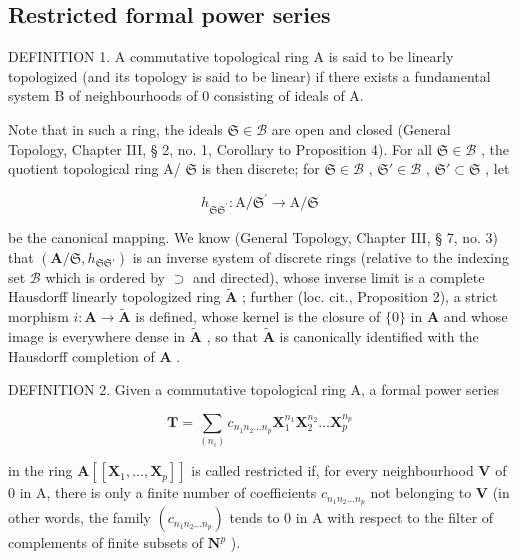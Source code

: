 \subsection{Restricted formal power series}

DEFINITION 1. A commutative topological ring A is said to be linearly topologized (and its topology is said to be linear) if there exists a fundamental system B of neighbourhoods of 0 consisting of ideals of A.

Note that in such a ring, the ideals \(\mathfrak{S} \in \mathcal{B}\) are open and closed (General Topology, Chapter III, § 2, no. 1, Corollary to Proposition 4). For all \(\mathfrak{S} \in \mathcal{B}\) , the quotient topological ring A/ \(\mathfrak{S}\) is then discrete; for \(\mathfrak{S} \in \mathcal{B}\) , \(\mathfrak{S}' \in \mathcal{B}\) , \(\mathfrak{S}' \subset \mathfrak{S}\) , let

\[
h _ {\mathfrak {S S} ^ {\prime}} \colon \mathrm{A} / \mathfrak {S} ^ {\prime} \rightarrow \mathrm{A} / \mathfrak {S}
\]

be the canonical mapping. We know (General Topology, Chapter III, § 7, no. 3) that \((\mathbf{A} / \mathfrak{S}, h_{\mathfrak{S}\mathfrak{S}'})\) is an inverse system of discrete rings (relative to the indexing set \(\mathcal{B}\) which is ordered by \(\supset\) and directed), whose inverse limit is a complete Hausdorff linearly topologized ring \(\tilde{\mathbf{A}}\) ; further (loc. cit., Proposition 2), a strict morphism \(i: \mathbf{A} \to \tilde{\mathbf{A}}\) is defined, whose kernel is the closure of \(\{0\}\) in \(\mathbf{A}\) and whose image is everywhere dense in \(\tilde{\mathbf{A}}\) , so that \(\tilde{\mathbf{A}}\) is canonically identified with the Hausdorff completion of \(\mathbf{A}\) .

DEFINITION 2. Given a commutative topological ring A, a formal power series

\[
\mathbf {T} = \sum_ {(n _ {i})} c _ {n _ {1} n _ {2} \dots n _ {p}} \mathbf {X} _ {1} ^ {n _ {1}} \mathbf {X} _ {2} ^ {n _ {2}} \dots \mathbf {X} _ {p} ^ {n _ {p}}
\]

in the ring \(\mathbf{A}[[\mathbf{X}_1,\ldots ,\mathbf{X}_p]]\) is called restricted if, for every neighbourhood \(\mathbf{V}\) of 0 in A, there is only a finite number of coefficients \(c_{n_1n_2\dots n_p}\) not belonging to \(\mathbf{V}\) (in other words, the family \((c_{n_1n_2\dots n_p})\) tends to 0 in A with respect to the filter of complements of finite subsets of \(\mathbf{N}^p\) ).

